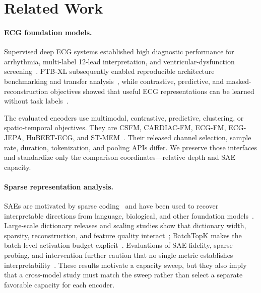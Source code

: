 \section{Related Work}

\paragraph{ECG foundation models.}
Supervised deep ECG systems established high diagnostic performance for arrhythmia, multi-label 12-lead interpretation, and ventricular-dysfunction screening~\cite{hannun2019cardiologist,ribeiro2020automatic,attia2019screening}. PTB-XL subsequently enabled reproducible architecture benchmarking and transfer analysis~\cite{strodthoff2021benchmark}, while contrastive, predictive, and masked-reconstruction objectives showed that useful ECG representations can be learned without task labels~\cite{mehari2022ssl,kiyasseh2021clocs,vaid2023heartbeit}.

The evaluated encoders use multimodal, contrastive, predictive, clustering, or spatio-temporal objectives. They are CSFM, CARDIAC-FM, ECG-FM, ECG-JEPA, HuBERT-ECG, and ST-MEM~\cite{gu2026csfm,li2026cardiacfm,mckeen2025ecgfm,kim2024ecgjepa,coppola2024hubert,na2024stmem}. Their released channel selection, sample rate, duration, tokenization, and pooling APIs differ. We preserve those interfaces and standardize only the comparison coordinates---relative depth and SAE capacity.

\paragraph{Sparse representation analysis.}
SAEs are motivated by sparse coding~\cite{olshausen1997sparse,mairal2009dictionary} and have been used to recover interpretable directions from language, biological, and other foundation models~\cite{bricken2023monosemanticity,simon2025interplm}. Large-scale dictionary releases and scaling studies show that dictionary width, sparsity, reconstruction, and feature quality interact~\cite{cunningham2024sae,gao2025scaling,templeton2024scaling,lieberum2024gemmascope}; BatchTopK makes the batch-level activation budget explicit~\cite{bussmann2024batchtopk}. Evaluations of SAE fidelity, sparse probing, and intervention further caution that no single metric establishes interpretability~\cite{makelov2025principled,karvonen2025saebench}. These results motivate a capacity sweep, but they also imply that a cross-model study must match the sweep rather than select a separate favorable capacity for each encoder.

